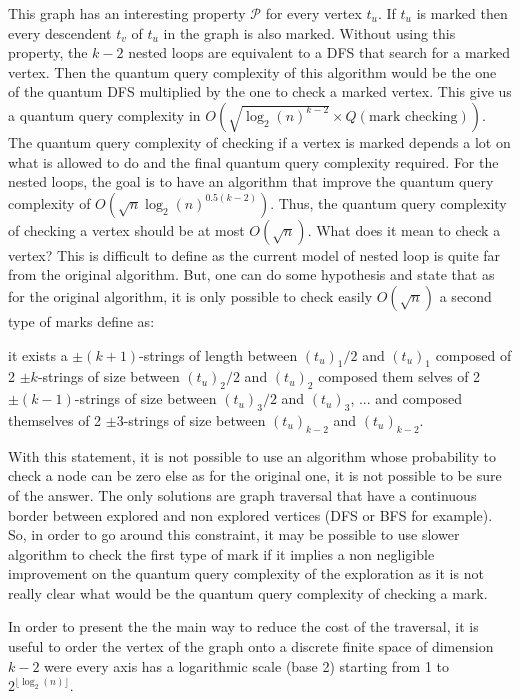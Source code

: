 This graph has an interesting property $\mathcal{P}$ for every vertex $t_u$.
If $t_u$ is marked then every descendent $t_v$ of $t_u$ in the graph is also
marked.
Without using this property, the $k-2$ nested loops are equivalent to a DFS that
search for a marked vertex. Then the quantum query complexity of this algorithm
would be the one of the quantum DFS multiplied by the one to check a marked vertex.
This give us a quantum query complexity in
$O\left(\sqrt{\log_2(n)^{k-2}}\times Q(\textrm{mark\ checking})\right)$.
The quantum query complexity of checking if a vertex is marked depends a lot
on what is allowed to do and the final quantum query complexity required.
For the nested loops, the goal is to have an algorithm that improve the quantum
query complexity of $O\left(\sqrt{n}\log_2(n)^{0.5(k-2)}\right)$. Thus, the quantum
query complexity of checking a vertex should be at most $O(\sqrt{n})$.
What does it mean to check a vertex? This is difficult to define as the current
model of nested loop is quite far from the original algorithm. But, one can do
some hypothesis and state that as for the original algorithm, it is only possible
to check easily $O(\sqrt{n})$ a second type of marks define as:
\begin{center}
    \begin{minipage}{.8\textwidth}
        it exists a $\pm (k+1)$-strings of length between $(t_u)_1/2$ and  $(t_u)_1$ composed of
        2 $\pm k$-strings of size between $(t_u)_2/2$ and $(t_u)_2$ composed them selves of 2
        $\pm (k-1)$-strings of size between $(t_u)_3/2$ and $(t_u)_3$, ... and composed themselves
        of  2 $\pm 3$-strings of size between $(t_u)_{k-2}$ and $(t_u)_{k-2}$.
    \end{minipage}
\end{center}

With this statement, it is not possible to use an algorithm whose probability
to check a node can be zero else as for the original one, it is not possible
to be sure of the answer. The only solutions are graph traversal that have
a continuous border between explored and non explored vertices (DFS or BFS
for example). So, in order to go around this constraint, it may be possible
to use slower algorithm to check the first type of mark if it implies a
non negligible improvement on the quantum query complexity of the exploration
as it is not really clear what would be the quantum query complexity of checking
a mark.

In order to present the the main way to reduce the cost of the traversal,
it is useful to order the vertex of the graph onto a discrete finite space
of dimension $k-2$ were every axis has a logarithmic scale (base 2) starting
from 1 to $2^{\lfloor \log_2(n) \rfloor}$.

